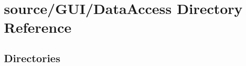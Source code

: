 \section{source/\+G\+U\+I/\+Data\+Access Directory Reference}
\label{dir_14bcfea012bfd9e88c2b2948069f5763}
\subsection*{Directories}
\begin{DoxyCompactItemize}
\end{DoxyCompactItemize}
